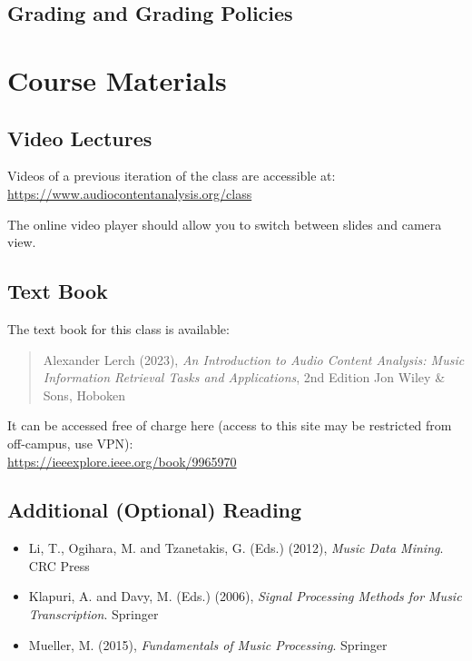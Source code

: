 \documentclass[letterpaper,oneside,10pt]{scrartcl}
\begin{document}
    \subsection{Grading and Grading Policies}
         

    \section{Course Materials}
        \subsection{Video Lectures}
            Videos of a previous iteration of the class are accessible at:\\            
            \url{https://www.audiocontentanalysis.org/class}
            
            The online video player should allow you to switch between slides and camera view.
            
        \subsection{Text Book}
            
           The text book for this class is available:
            \begin{quote}
            Alexander Lerch (2023), \textit{An Introduction to Audio Content Analysis: Music Information Retrieval Tasks and Applications}, 2nd Edition Jon Wiley \& Sons, Hoboken
            \end{quote}
            It can be accessed free of charge here (access to this site may be restricted from off-campus, use VPN):\\        
            \url{https://ieeexplore.ieee.org/book/9965970}
        
            
        \subsection{Additional (Optional) Reading}
            \begin{itemize}
                \item    Li, T., Ogihara, M. and Tzanetakis, G. (Eds.) (2012), \textit{Music Data Mining}. CRC Press 
                \item    Klapuri, A. and Davy, M. (Eds.) (2006), \textit{Signal Processing Methods for Music Transcription}. Springer 
                \item    Mueller, M. (2015), \textit{Fundamentals of Music Processing}. Springer
            \end{itemize}
        
\end{document}
